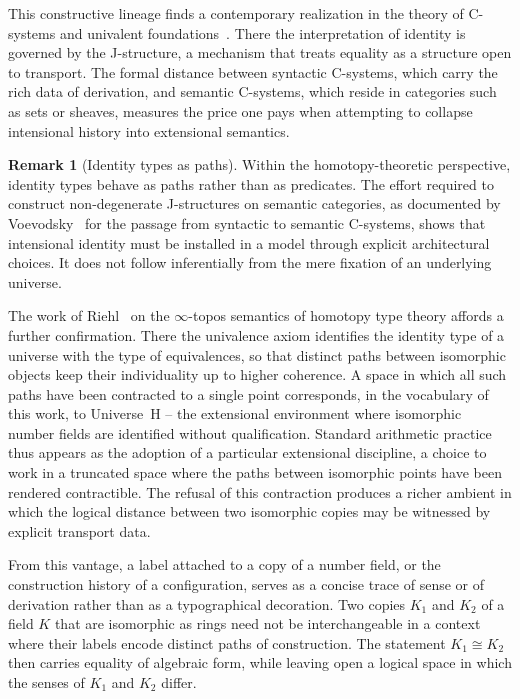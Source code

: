 \documentclass[10pt, reqno]{amsart}
\theoremstyle{plain}
\theoremstyle{definition}
\newtheorem{remark}[theorem]{Remark}
\theoremstyle{plain}
\begin{document}
This constructive lineage finds a contemporary realization in the theory of C-systems and univalent foundations~\cite{voevodsky2023martin}. There the interpretation of identity is governed by the J-structure, a mechanism that treats equality as a structure open to transport. The formal distance between syntactic C-systems, which carry the rich data of derivation, and semantic C-systems, which reside in categories such as sets or sheaves, measures the price one pays when attempting to collapse intensional history into extensional semantics.

\begin{remark}[Identity types as paths]\label{rem:IntensionalRealignment}
Within the homotopy-theoretic perspective, identity types behave as paths rather than as predicates. The effort required to construct non-degenerate J-structures on semantic categories, as documented by Voevodsky~\cite{voevodsky2023martin} for the passage from syntactic to semantic C-systems, shows that intensional identity must be installed in a model through explicit architectural choices. It does not follow inferentially from the mere fixation of an underlying universe.

The work of Riehl~\cite{Riehl2024} on the $\infty$-topos semantics of homotopy type theory affords a further confirmation. There the univalence axiom identifies the identity type of a universe with the type of equivalences, so that distinct paths between isomorphic objects keep their individuality up to higher coherence. A space in which all such paths have been contracted to a single point corresponds, in the vocabulary of this work, to Universe~H -- the extensional environment where isomorphic number fields are identified without qualification. Standard arithmetic practice thus appears as the adoption of a particular extensional discipline, a choice to work in a truncated space where the paths between isomorphic points have been rendered contractible. The refusal of this contraction produces a richer ambient in which the logical distance between two isomorphic copies may be witnessed by explicit transport data.
\end{remark}

From this vantage, a label attached to a copy of a number field, or the construction history of a configuration, serves as a concise trace of sense or of derivation rather than as a typographical decoration. Two copies $K_1$ and $K_2$ of a field $K$ that are isomorphic as rings need not be interchangeable in a context where their labels encode distinct paths of construction. The statement $K_1 \cong K_2$ then carries equality of algebraic form, while leaving open a logical space in which the senses of $K_1$ and $K_2$ differ.
\end{document}

